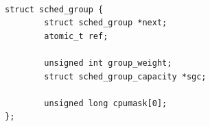 \documentclass[
  master=true,
  font=sans,
  printversion=false,
  joinlists=true,
  figures=true,
  tables=true,
  sourcecodes=false,
  theorems=false,
  bibencoding=utf8,
  language=czech,
  encoding=utf8,
  field=ainfk,
  biblatex,
  glossaries,
  index
]{kidiplom}
\begin{document}
%
%
%
%
%
%
%
%

\begin{verbatim} 

struct sched_group {
        struct sched_group *next;
        atomic_t ref;

        unsigned int group_weight;
        struct sched_group_capacity *sgc;

        unsigned long cpumask[0];
};

\end{verbatim} 
\end{document}
